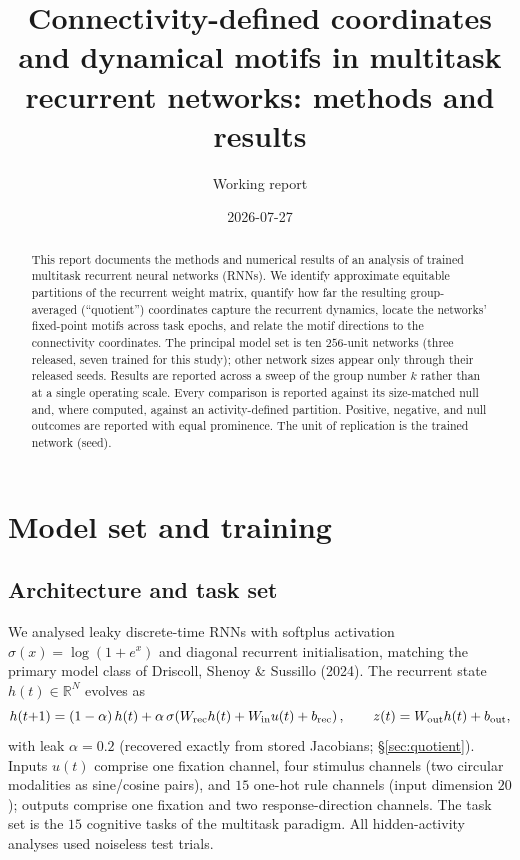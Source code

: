 \documentclass[11pt]{article}
\title{Connectivity-defined coordinates and dynamical motifs in multitask
recurrent networks: methods and results}
\author{Working report}
\date{2026-07-27}
\begin{document}
\maketitle

\begin{abstract}
This report documents the methods and numerical results of an analysis of trained multitask
recurrent neural networks (RNNs). We identify approximate equitable partitions of the recurrent
weight matrix, quantify how far the resulting group-averaged (``quotient'') coordinates capture
the recurrent dynamics, locate the networks' fixed-point motifs across task epochs, and relate
the motif directions to the connectivity coordinates. The principal model set is ten $256$-unit
networks (three released, seven trained for this study); other network sizes appear only through
their released seeds. Results are reported across a sweep of the group number $k$ rather than at
a single operating scale. Every comparison is reported against its size-matched null and, where
computed, against an activity-defined partition. Positive, negative, and null outcomes are
reported with equal prominence. The unit of replication is the trained network (seed).
\end{abstract}

\tableofcontents

\section{Model set and training}

\subsection{Architecture and task set}
We analysed leaky discrete-time RNNs with softplus activation $\sigma(x)=\log(1+e^{x})$ and
diagonal recurrent initialisation, matching the primary model class of Driscoll, Shenoy \&
Sussillo (2024). The recurrent state $h(t)\in\mathbb{R}^{N}$ evolves as
\[
h(t{+}1)=(1-\alpha)\,h(t)+\alpha\,\sigma\!\left(W_{\rm rec}h(t)+W_{\rm in}u(t)+b_{\rm rec}\right),
\qquad z(t)=W_{\rm out}h(t)+b_{\rm out},
\]
with leak $\alpha=0.2$ (recovered exactly from stored Jacobians; \S\ref{sec:quotient}). Inputs
$u(t)$ comprise one fixation channel, four stimulus channels (two circular modalities as
sine/cosine pairs), and $15$ one-hot rule channels (input dimension $20$); outputs comprise one
fixation and two response-direction channels. The task set is the $15$ cognitive tasks of the
multitask paradigm. All hidden-activity analyses used noiseless test trials.
\end{document}
